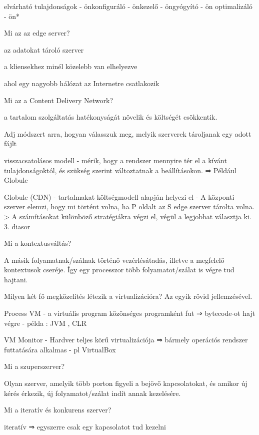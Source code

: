 \documentclass[12pt]{article}
\begin{document}
\begin{description}
    \item elvárható tulajdonságok
        - önkonfiguráló
        - önkezelő
        - öngyógyító
        - ön optimalizáló
        - ön*
    \item Mi az az edge server?
    \item az adatokat tároló szerver
    \item a kliensekhez minél közelebb van elhelyezve
    \item ahol egy nagyobb hálózat az Internetre csatlakozik
    \item Mi az a  Content Delivery Network?
    \item a tartalom szolgáltatás hatékonyságát növelik és költségét csökkentik.
    \item Adj módszert arra, hogyan válasszuk meg, melyik szerverek tároljanak egy adott fájlt
    \item visszacsatolásos modell
        - mérik, hogy a rendszer mennyire tér el a kívánt tulajdonságoktól, és szükség szerint változtatnak a
        beállításokon. ⇒ Például Globule
    \item Globule (CDN)
        - tartalmakat költségmodell alapján helyezi el
        - A központi szerver elemzi, hogy mi történt volna, ha P oldalt az S edge szerver tárolta volna.
        > A számításokat különböző stratégiákra végzi el, végül a legjobbat választja ki.
        3. diasor
    \item  Mi a kontextusváltás?
    \item A másik folyamatnak/szálnak történő  vezérlésátadás, illetve a megfelelő kontextusok cseréje. Így egy
        processzor több folyamatot/szálat is végre tud hajtani.
    \item  Milyen két fő megközelítés létezik a virtualizációra? Az egyik rövid jellemzésével.
    \item Process VM
        - a virtuális program közönséges programként fut ⇒ bytecode-ot hajt végre
        - példa : JVM , CLR
    \item VM Monitor
        - Hardver teljes körű virtualizációja ⇒ bármely operációs rendszer futtatására alkalmas
        - pl VirtualBox
    \item  Mi a szuperszerver?
    \item Olyan szerver, amelyik több porton figyeli a bejövő kapcsolatokat, és amikor új kérés érkezik, új folyamatot/szálat indít
        annak kezelésére. 
    \item  Mi a iteratív és konkurens szerver?
    \item iteratív  ⇒ egyszerre csak egy kapcsolatot tud kezelni

\end{description}
\end{document}
